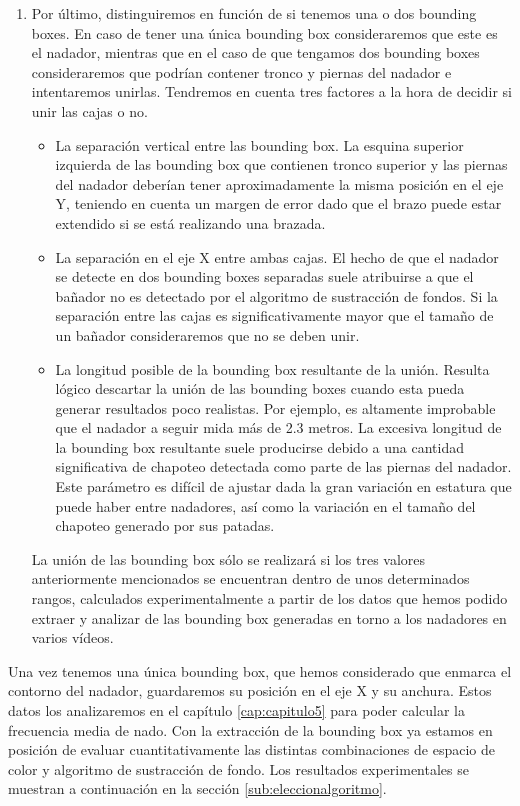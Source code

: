 \begin{enumerate}
    \item Por último, distinguiremos en función de si tenemos una o dos bounding boxes. En caso de tener una única bounding box consideraremos que este es el nadador, mientras que en el caso de que tengamos dos bounding boxes consideraremos que podrían contener tronco y piernas del nadador e intentaremos unirlas. Tendremos en cuenta tres factores a la hora de decidir si unir las cajas o no. 
        \begin{itemize}
            \item La separación vertical entre las bounding box. La esquina superior izquierda de las bounding box que contienen tronco superior y las piernas del nadador deberían tener aproximadamente la misma posición en el eje Y, teniendo en cuenta un margen de error dado que el brazo puede estar extendido si se está realizando una brazada.
            \item La separación en el eje X entre ambas cajas. El hecho de que el nadador se detecte en dos bounding boxes separadas suele atribuirse a que el bañador no es detectado por el algoritmo de sustracción de fondos. Si la separación entre las cajas es significativamente mayor que el tamaño de un bañador consideraremos que no se deben unir.
            \item La longitud posible de la bounding box resultante de la unión. Resulta lógico descartar la unión de las bounding boxes cuando esta pueda generar resultados poco realistas. Por ejemplo, es altamente improbable que el nadador a seguir mida más de 2.3 metros. La excesiva longitud de la bounding box resultante suele producirse debido a una cantidad significativa de chapoteo detectada como parte de las piernas del nadador. Este parámetro es difícil de ajustar dada la gran variación en estatura que puede haber entre nadadores, así como la variación en el tamaño del chapoteo generado por sus patadas.
        \end{itemize}
    La unión de las bounding box sólo se realizará si los tres valores anteriormente mencionados se encuentran dentro de unos determinados rangos, calculados experimentalmente a partir de los datos que hemos podido extraer y analizar de las bounding box generadas en torno a los nadadores en varios vídeos. 
\end{enumerate}

Una vez tenemos una única bounding box, que hemos considerado que enmarca el contorno del nadador, guardaremos su posición en el eje X y su anchura. Estos datos los analizaremos en el capítulo \ref{cap:capitulo5} para poder calcular la frecuencia media de nado. Con la extracción de la bounding box ya estamos en posición de evaluar cuantitativamente las distintas combinaciones de espacio de color y algoritmo de sustracción de fondo. Los resultados experimentales se muestran a continuación en la sección \ref{sub:eleccionalgoritmo}.


